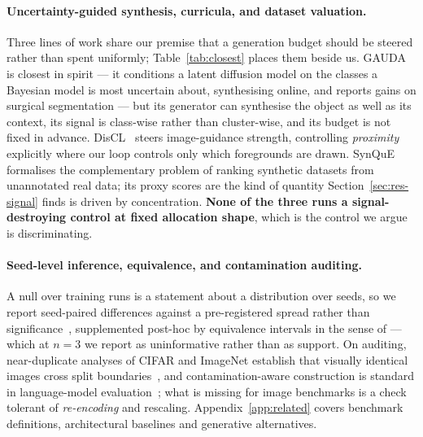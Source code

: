 \documentclass{article} %
\begin{document}
\paragraph{Uncertainty-guided synthesis, curricula, and dataset valuation.}
Three lines of work share our premise that a generation budget should be steered rather than spent
uniformly; Table~\ref{tab:closest} places them beside us. GAUDA~\cite{frisch2025gauda} is closest in
spirit --- it conditions a latent diffusion model on the classes a Bayesian model is most uncertain
about, synthesising online, and reports gains on surgical segmentation --- but its generator can
synthesise the object as well as its context, its signal is class-wise rather than cluster-wise, and
its budget is not fixed in advance. DisCL~\cite{liang2025discl} steers image-guidance strength,
controlling \emph{proximity} explicitly where our loop controls only which foregrounds are drawn.
SynQuE~\cite{chen2025synque} formalises the complementary problem of ranking synthetic datasets from
unannotated real data; its proxy scores are the kind of quantity Section~\ref{sec:res-signal} finds
is driven by concentration. \textbf{None of the three runs a signal-destroying control at fixed
allocation shape}, which is the control we argue is discriminating.

\paragraph{Seed-level inference, equivalence, and contamination auditing.}
A null over training runs is a statement about a distribution over seeds, so we report seed-paired
differences against a pre-registered spread rather than significance~\cite{pineau2021improving},
supplemented post-hoc by equivalence intervals in the sense of \citet{lakens2017equivalence} ---
which at $n = 3$ we report as uninformative rather than as support. On auditing, near-duplicate
analyses of CIFAR and ImageNet establish that visually identical images cross split
boundaries~\cite{barz2020train}, and contamination-aware construction is standard in language-model
evaluation~\cite{wu2024antileak}; what is missing for image benchmarks is a check tolerant of
\emph{re-encoding} and rescaling. Appendix~\ref{app:related} covers benchmark definitions,
architectural baselines and generative alternatives.
\end{document}
